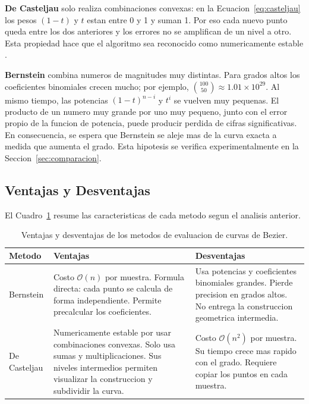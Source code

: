 \textbf{De Casteljau} solo realiza combinaciones convexas: en la Ecuacion~\ref{eq:casteljau} los pesos $(1 - t)$ y $t$ estan entre 0 y 1 y suman 1. Por eso cada nuevo punto queda entre los dos anteriores y los errores no se amplifican de un nivel a otro. Esta propiedad hace que el algoritmo sea reconocido como numericamente estable \cite{farouki1987}.

\textbf{Bernstein} combina numeros de magnitudes muy distintas. Para grados altos los coeficientes binomiales crecen mucho; por ejemplo, $\binom{100}{50} \approx 1.01 \times 10^{29}$. Al mismo tiempo, las potencias $(1-t)^{n-i}$ y $t^{i}$ se vuelven muy pequenas. El producto de un numero muy grande por uno muy pequeno, junto con el error propio de la funcion de potencia, puede producir perdida de cifras significativas. En consecuencia, se espera que Bernstein se aleje mas de la curva exacta a medida que aumenta el grado. Esta hipotesis se verifica experimentalmente en la Seccion~\ref{sec:comparacion}.

\subsection{Ventajas y Desventajas}
\label{subsec:fund_ventajas}

El Cuadro~\ref{tab:fund_ventajas} resume las caracteristicas de cada metodo segun el analisis anterior.

\begin{table}[H]
\centering
\caption{Ventajas y desventajas de los metodos de evaluacion de curvas de Bezier.}
\label{tab:fund_ventajas}
\begin{tabular}{p{2.2cm} p{6cm} p{6cm}}
\toprule
\textbf{Metodo} & \textbf{Ventajas} & \textbf{Desventajas} \\
\midrule
Bernstein &
Costo $\mathcal{O}(n)$ por muestra. Formula directa: cada punto se calcula de forma independiente. Permite precalcular los coeficientes. &
Usa potencias y coeficientes binomiales grandes. Pierde precision en grados altos. No entrega la construccion geometrica intermedia. \\
\midrule
De Casteljau &
Numericamente estable por usar combinaciones convexas. Solo usa sumas y multiplicaciones. Sus niveles intermedios permiten visualizar la construccion y subdividir la curva. &
Costo $\mathcal{O}(n^2)$ por muestra. Su tiempo crece mas rapido con el grado. Requiere copiar los puntos en cada muestra. \\
\bottomrule
\end{tabular}
\end{table}


